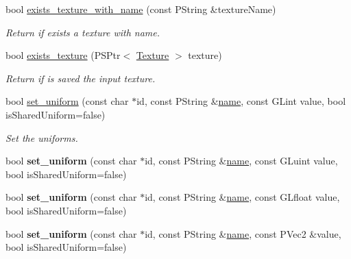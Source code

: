 \begin{DoxyCompactItemize}
bool \mbox{\hyperlink{classprz_1_1_material_a37642f991c010bec61b60cffb5ae44cb}{exists\+\_\+texture\+\_\+with\+\_\+name}} (const P\+String \&texture\+Name)
\begin{DoxyCompactList}\small\item\em Return if exists a texture with name. \end{DoxyCompactList}\item 
bool \mbox{\hyperlink{classprz_1_1_material_a48029def7213cab037704cf2ca1a485e}{exists\+\_\+texture}} (P\+S\+Ptr$<$ \mbox{\hyperlink{classprz_1_1_texture}{Texture}} $>$ texture)
\begin{DoxyCompactList}\small\item\em Return if is saved the input texture. \end{DoxyCompactList}\item 
bool \mbox{\hyperlink{classprz_1_1_material_a7c0a75268c108df5c8b7779c9be7b80a}{set\+\_\+uniform}} (const char $\ast$id, const P\+String \&\mbox{\hyperlink{classprz_1_1_material_ab1b2f9074aea77954b1ad70b72f48c3a}{name}}, const G\+Lint value, bool is\+Shared\+Uniform=false)
\begin{DoxyCompactList}\small\item\em Set the uniforms. \end{DoxyCompactList}\item 
\mbox{\label{classprz_1_1_material_ac595a04846ef46f3f5bdf74b9b5b0227}} 
bool {\bfseries set\+\_\+uniform} (const char $\ast$id, const P\+String \&\mbox{\hyperlink{classprz_1_1_material_ab1b2f9074aea77954b1ad70b72f48c3a}{name}}, const G\+Luint value, bool is\+Shared\+Uniform=false)
\item 
\mbox{\label{classprz_1_1_material_af69e46e72e2eeb4baa102947673f17fe}} 
bool {\bfseries set\+\_\+uniform} (const char $\ast$id, const P\+String \&\mbox{\hyperlink{classprz_1_1_material_ab1b2f9074aea77954b1ad70b72f48c3a}{name}}, const G\+Lfloat value, bool is\+Shared\+Uniform=false)
\item 
\mbox{\label{classprz_1_1_material_ad97f9b96213fb116bf633943f2038f86}} 
bool {\bfseries set\+\_\+uniform} (const char $\ast$id, const P\+String \&\mbox{\hyperlink{classprz_1_1_material_ab1b2f9074aea77954b1ad70b72f48c3a}{name}}, const P\+Vec2 \&value, bool is\+Shared\+Uniform=false)
\item 
\mbox{\label{classprz_1_1_material_a3d876b8c363c04d1cd820305fc212ba5}} 

\end{DoxyCompactItemize}

